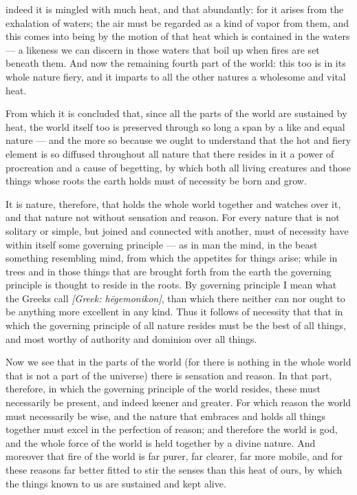 indeed it is mingled with much heat, and that abundantly: for it arises from the exhalation of waters; the air must be regarded as a kind of vapor from them, and this comes into being by the motion of that heat which is contained in the waters — a likeness we can discern in those waters that boil up when fires are set beneath them. And now the remaining fourth part of the world: this too is in its whole nature fiery, and it imparts to all the other natures a wholesome and vital heat.

 From which it is concluded that, since all the parts of the world are sustained by heat, the world itself too is preserved through so long a span by a like and equal nature — and the more so because we ought to understand that the hot and fiery element is so diffused throughout all nature that there resides in it a power of procreation and a cause of begetting, by which both all living creatures and those things whose roots the earth holds must of necessity be born and grow.

 It is nature, therefore, that holds the whole world together and watches over it, and that nature not without sensation and reason. For every nature that is not solitary or simple, but joined and connected with another, must of necessity have within itself some governing principle — as in man the mind, in the beast something resembling mind, from which the appetites for things arise; while in trees and in those things that are brought forth from the earth the governing principle is thought to reside in the roots. By governing principle I mean what the Greeks call \textit{[Greek: hēgemonikon]}, than which there neither can nor ought to be anything more excellent in any kind. Thus it follows of necessity that that in which the governing principle of all nature resides must be the best of all things, and most worthy of authority and dominion over all things.

 Now we see that in the parts of the world (for there is nothing in the whole world that is not a part of the universe) there is sensation and reason. In that part, therefore, in which the governing principle of the world resides, these must necessarily be present, and indeed keener and greater. For which reason the world must necessarily be wise, and the nature that embraces and holds all things together must excel in the perfection of reason; and therefore the world is god, and the whole force of the world is held together by a divine nature. And moreover that fire of the world is far purer, far clearer, far more mobile, and for these reasons far better fitted to stir the senses than this heat of ours, by which the things known to us are sustained and kept alive.

